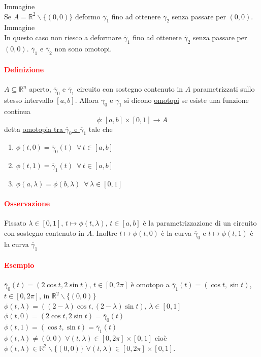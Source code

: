 \documentclass{article}
\newcommand{\R}{\mathbb{R}}
\begin{document}
Immagine\\
Se $A=\R^2\backslash\{(0,0)\}$ deformo $\overline{\gamma}_1$ fino ad ottenere $\overline{\gamma}_2$ senza passare per $(0,0)$.\\
Immagine\\
In questo caso non riesco a deformare $\overline{\gamma}_1$ fino ad ottenere $\overline{\gamma}_2$ senza passare per $(0,0)$. $\overline{\gamma}_1$ e $\overline{\gamma}_2$ non sono omotopi. 

\paragraph{\textcolor{red}{Definizione}}
$A \subseteq \R^n$ aperto, $\overline{\gamma}_0$ e $\overline{\gamma}_1$ circuito con sostegno contenuto in $A$ parametrizzati sullo stesso intervallo $[a,b]$. Allora $\overline{\gamma}_0$ e $\overline{\gamma}_1$ si dicono \underline{omotopi} se esiste una funzione continua 
\begin{equation*}
    \phi: [a,b]\times [0,1]\rightarrow A
\end{equation*}
detta \underline{omotopia tra $\overline{\gamma}_0$ e $\overline{\gamma}_1$} tale che
\begin{enumerate}
    \item $\phi(t,0)=\overline{\gamma}_0(t)\,\,\, \forall\, t \in [a,b]$
    \item $\phi(t,1)=\overline{\gamma}_1(t)\,\,\, \forall\, t \in [a,b]$
    \item $\phi(a,\lambda)=\phi(b,\lambda)\,\,\, \forall \, \lambda \in[0,1]$
\end{enumerate}
\paragraph{\textcolor{red}{Osservazione}}
Fissato $\lambda \in[0,1]$, $t \mapsto \phi(t,\lambda)$, $t \in [a,b]$ è la parametrizzazione di un circuito con sostegno contenuto  in $A$. Inoltre  $t \mapsto \phi(t,0)$ è la curva $\overline{\gamma}_0$ e $t \mapsto \phi(t,1)$ è la curva $\overline{\gamma}_1$
\paragraph{\textcolor{red}{Esempio}}
$\overline{\gamma}_0 (t)=(2\cos t , 2 \sin t)$, $t\in [0,2\pi]$ è omotopo a $\overline{\gamma}_1(t)=(\cos t , \sin t)$, $t \in [0,2\pi]$, in $\R^2\backslash \{(0,0)\}$\\
$\phi(t,\lambda)=((2-\lambda)\cos t, (2-\lambda)\sin t)$,  $\lambda \in [0,1]$\\
$\phi (t,0) =(2\cos t, 2 \sin t)=\overline{\gamma}_0 (t)$\\
$\phi(t,1)=(\cos t , \sin t)=\overline{\gamma}_1(t)$\\
$\phi(t,\lambda) \neq (0,0) \,\, \forall (t,\lambda)\in [0,2\pi]\times[0,1]$ cioè $\phi(t,\lambda) \in \R^2 \backslash \{(0,0)\}\,\, \forall (t,\lambda)\in[0,2\pi]\times [0,1]$.
\end{document}
